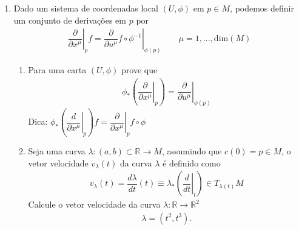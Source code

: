 \begin{enumerate}
\begin{align}
\begin{matrix}
		               \end{matrix}\right)=\left(\begin{matrix}
			                                         cos(\alpha) & -sen(\alpha) \\
			                                         sen(\alpha) & cos(\alpha)  \\
		                                         \end{matrix}\right)
		      \left(\begin{matrix}
			            x \\
			            y \\
		            \end{matrix}\right)
	      \end{align}
	      Para um campo vetorial $X=-y\partial/\partial x+x\partial/\partial y$,
	      determine o vetor $h_*(X)\in T_{h(x,y)}\mathbb{R}^2$. %
	      Sandro n passou campo vetorial posso pedir um vetor tangente em um determinado
	      ponto mas manter a estrutura do problema.
	\item Dado um sistema de coordenadas local $(U,\phi)$ em $p \in M$, podemos definir
	      um conjunto de derivações em $p$ por
	      \begin{align}
		      \left.\dfrac{\partial}{\partial x^{\mu}}\right|_{p}f=
		      \left.\dfrac{\partial}{\partial u^{\mu}}f\circ\phi^{-1}\right|_{\phi(p)}\qquad
		      \mu=1,...,\text{dim}(M)
	      \end{align}
	      \begin{enumerate}
		      \item Para uma carta $(U,\phi)$ prove que
		            \begin{align}
			            \phi_*\left(\left.\dfrac{\partial}{\partial x^{\mu}}\right|_{p}\right) =
			            \left.\dfrac{\partial}{\partial u^{\mu}}\right|_{\phi(p)}
		            \end{align}
		            Dica: $\phi_*\left(\left.\dfrac{d}{\partial x^{\mu}}\right|_p\right)f =
			            \left.\dfrac{\partial}{\partial x^{\mu}}\right|_{p}f\circ \phi$
		      \item  Seja uma curva $\lambda:(a,b)\subset\mathbb{R}\rightarrow M$,
		            assumindo que $c(0)=p \in M$, o vetor velocidade $v_{\lambda}(t)$ da curva
		            $\lambda$ é definido como
		            \begin{align}
			            v_{\lambda}(t)=\dfrac{d\lambda}{dt}(t)\equiv
			            \lambda_*\left(\left.\dfrac{d}{dt}\right|_t\right)\in T_{\lambda(t)}M
		            \end{align}
		            Calcule o vetor velocidade da curva
		            $\lambda:\mathbb{R}\rightarrow\mathbb{R}^2$
		            \begin{align}
			            \lambda=(t^2,t^3).
		            \end{align}
	      \end{enumerate}
\end{enumerate}

